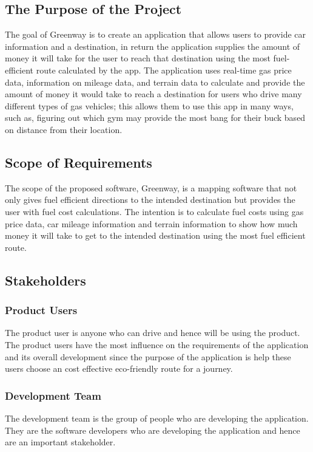 \documentclass[12pt]{article}
\begin{document}
\subsection{The Purpose of the Project}

The goal of Greenway is to create an application that allows users to provide car information and a destination, in return the application supplies the amount of money it will take for the user to reach that destination using the most fuel-efficient route calculated by the app. The application uses real-time gas price data, information on mileage data, and terrain data to calculate and provide the amount of money it would take to reach a destination for users who drive many different types of gas vehicles; this allows them to use this app in many ways, such as, figuring out which gym may provide the most bang for their buck based on distance from their location.

\subsection{Scope of Requirements} 

The scope of the proposed software, Greenway, is a mapping software that not only 
gives fuel efficient directions to the intended destination but provides the user with fuel cost calculations.
The intention is to calculate fuel costs using gas price data, car mileage information and terrain information
to show how much money it will take to get to the intended destination using the most fuel efficient route.

\subsection{Stakeholders}

\subsubsection{Product Users}
The product user is anyone who can drive and hence will be using the product. The product users have the most influence on the requirements of the application and its overall development since the purpose of the application is help these users choose an cost effective eco-friendly route for a journey.

\subsubsection{Development Team}
The development team is the group of people who are developing the application. They are the software developers who are developing the application and hence are an important stakeholder.
\end{document}
